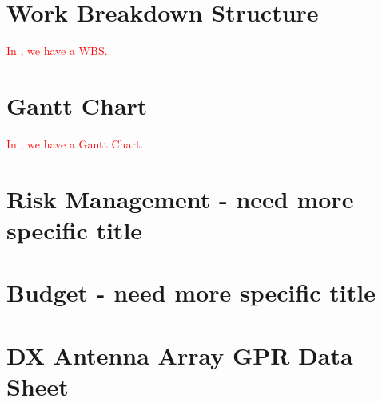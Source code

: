\documentclass[main.tex]{subfiles}
\begin{document}
\begin{appendices}
\chapter{Work Breakdown Structure}
\textcolor{red}{In , we have a WBS.}

\chapter{Gantt Chart}
\textcolor{red}{In , we have a Gantt Chart.}

\chapter{Risk Management - need more specific title}

\chapter{Budget - need more specific title}

\chapter{DX Antenna Array GPR Data Sheet}


\end{appendices}
\end{document}
